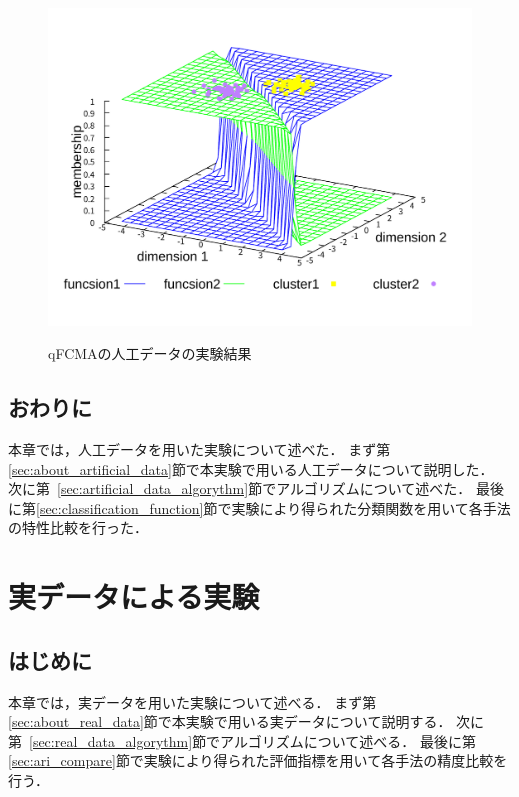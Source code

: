 \documentclass[a4j,12pt,dvipdfmx,oneside]{jsbook}
\theoremstyle{definition}
\begin{document}
\begin{figure}[p]
\begin{minipage}{0.43\hsize}
    \includegraphics[width=\linewidth]{qFCMA-Em11-Lambda10.pdf}
    \label{fig:qFCMA-Em11-Lambda10}
   \end{minipage}
   \vspace*{0.5cm}
   \caption{qFCMAの人工データの実験結果}
   \label{fig:qFCMA}
  \end{figure}
  
  \section{おわりに}\label{sec:artificial_data_summary}
  本章では，人工データを用いた実験について述べた．
  まず第\ref{sec:about_artificial_data}節で本実験で用いる人工データについて説明した．
  次に第~\ref{sec:artificial_data_algorythm}節でアルゴリズムについて述べた．
  最後に第\ref{sec:classification_function}節で実験により得られた分類関数を用いて各手法の特性比較を行った．
  
  
\chapter{実データによる実験}\label{chap:real_data}

 \section{はじめに}\label{sec:real_data_intro}
 本章では，実データを用いた実験について述べる．
 まず第\ref{sec:about_real_data}節で本実験で用いる実データについて説明する．
 次に第~\ref{sec:real_data_algorythm}節でアルゴリズムについて述べる．
 最後に第\ref{sec:ari_compare}節で実験により得られた評価指標を用いて各手法の精度比較を行う．
 
\end{document}
